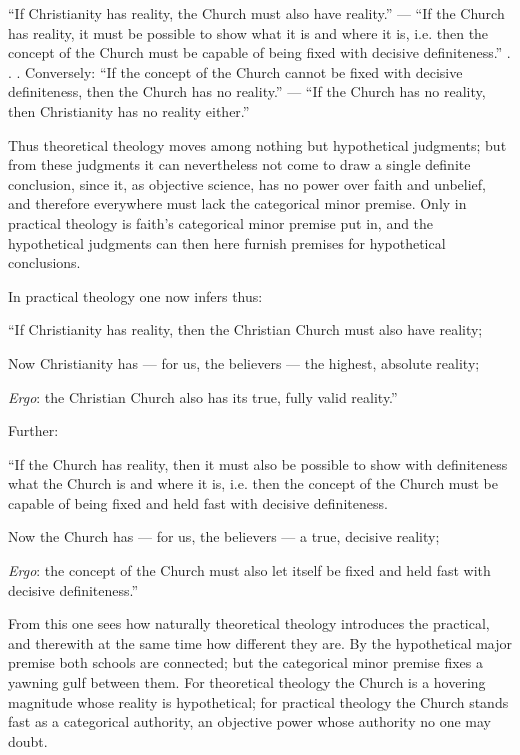 \documentclass[12pt,a4paper]{book}
\begin{document}
``If Christianity has reality, the Church must also have reality.'' --- ``If the Church has reality,
it must be possible to show what it is and where it is, i.e. then the concept of the Church must be
capable of being fixed with decisive definiteness.'' . . . Conversely: ``If the concept of the Church
cannot be fixed with decisive definiteness, then the Church has no reality.'' --- ``If the Church has
no reality, then Christianity has no reality either.''

Thus theoretical theology moves among nothing but hypothetical judgments; but from these judgments it
can nevertheless not come to draw a single definite conclusion, since it, as objective science, has no
power over faith and unbelief, and therefore everywhere must lack the categorical minor premise. Only
in practical theology is faith's categorical minor premise put in, and the hypothetical judgments can
then here furnish premises for hypothetical conclusions.

In practical theology one now infers thus:

``If Christianity has reality, then the Christian Church must also have reality;

Now Christianity has --- for us, the believers --- the highest, absolute reality;

\emph{Ergo}: the Christian Church also has its true, fully valid reality.''

Further:

``If the Church has reality, then it must also be possible to show with definiteness what the Church
is and where it is, i.e. then the concept of the Church must be capable of being fixed and held fast
with decisive definiteness.

Now the Church has --- for us, the believers --- a true, decisive reality;

\emph{Ergo}: the concept of the Church must also let itself be fixed and held fast with decisive
definiteness.''

From this one sees how naturally theoretical theology introduces the practical, and therewith at the
same time how different they are. By the hypothetical major premise both schools are connected; but
the categorical minor premise fixes a yawning gulf between them. For theoretical theology the Church
is a hovering magnitude whose reality is hypothetical; for practical theology the Church stands fast
as a categorical authority, an objective power whose authority no one may doubt.
\end{document}
